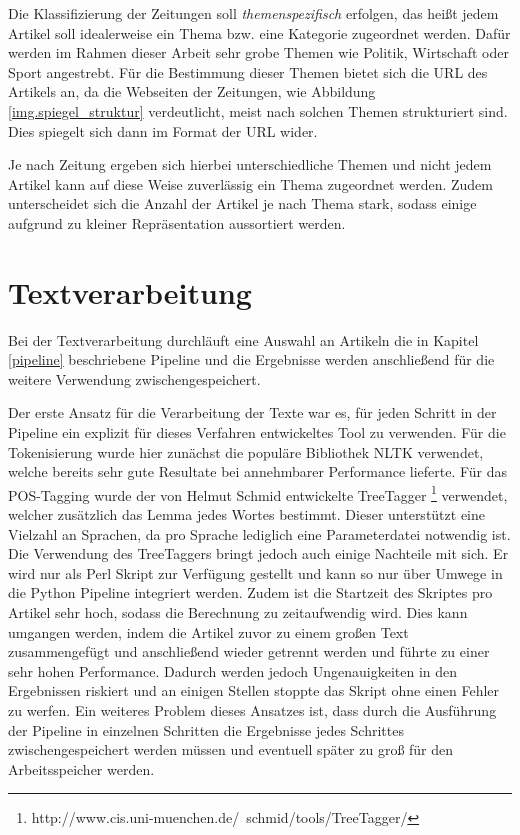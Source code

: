 Die Klassifizierung der Zeitungen soll \emph{themenspezifisch} erfolgen, das heißt jedem Artikel soll idealerweise ein Thema bzw. eine Kategorie zugeordnet werden. Dafür werden im Rahmen dieser Arbeit sehr grobe Themen wie Politik, Wirtschaft oder Sport angestrebt. Für die Bestimmung dieser Themen bietet sich die URL des Artikels an, da die Webseiten der Zeitungen, wie Abbildung \ref{img.spiegel_struktur} verdeutlicht, meist nach solchen Themen strukturiert sind. Dies spiegelt sich dann im Format der URL wider.


Je nach Zeitung ergeben sich hierbei unterschiedliche Themen und nicht jedem Artikel kann auf diese Weise zuverlässig ein Thema zugeordnet werden. Zudem unterscheidet sich die Anzahl der Artikel je nach Thema stark, sodass einige aufgrund zu kleiner Repräsentation aussortiert werden.

\section{Textverarbeitung}\label{textprocessing}
Bei der Textverarbeitung durchläuft eine Auswahl an Artikeln die in Kapitel \ref{pipeline} beschriebene Pipeline und die Ergebnisse werden anschließend für die weitere Verwendung zwischengespeichert.

Der erste Ansatz für die Verarbeitung der Texte war es, für jeden Schritt in der Pipeline ein explizit für dieses Verfahren entwickeltes Tool zu verwenden. Für die Tokenisierung wurde hier zunächst die populäre Bibliothek NLTK verwendet, welche bereits sehr gute Resultate bei annehmbarer Performance lieferte. Für das POS-Tagging wurde der von Helmut Schmid entwickelte TreeTagger \footnote{http://www.cis.uni-muenchen.de/~schmid/tools/TreeTagger/} verwendet, welcher zusätzlich das Lemma jedes Wortes bestimmt. Dieser unterstützt eine Vielzahl an Sprachen, da pro Sprache lediglich eine Parameterdatei notwendig ist. Die Verwendung des TreeTaggers bringt jedoch auch einige Nachteile mit sich. Er wird nur als Perl Skript zur Verfügung gestellt und kann so nur über Umwege in die Python Pipeline integriert werden. Zudem ist die Startzeit des Skriptes pro Artikel sehr hoch, sodass die Berechnung zu zeitaufwendig wird. Dies kann umgangen werden, indem die Artikel zuvor zu einem großen Text zusammengefügt und anschließend wieder getrennt werden und führte zu einer sehr hohen Performance. Dadurch werden jedoch Ungenauigkeiten in den Ergebnissen riskiert und an einigen Stellen stoppte das Skript ohne einen Fehler zu werfen. Ein weiteres Problem dieses Ansatzes ist, dass durch die Ausführung der Pipeline in einzelnen Schritten die Ergebnisse jedes Schrittes zwischengespeichert werden müssen und eventuell später zu groß für den Arbeitsspeicher werden.

